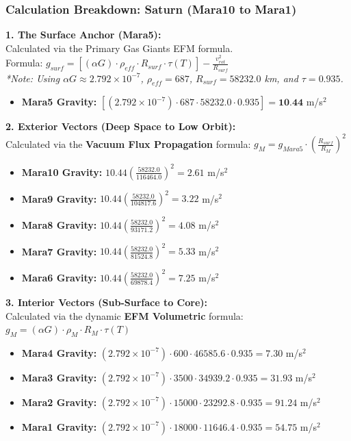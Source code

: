 \documentclass[11pt, a4paper]{article}
\begin{document}
\clearpage
\subsubsection{Calculation Breakdown: Saturn (Mara10 to Mara1)}

\noindent \textbf{1. The Surface Anchor (Mara5):} \\
Calculated via the Primary Gas Giants EFM formula. \\
Formula: $g_{surf} = \left[ (\alpha G) \cdot \rho_{eff} \cdot R_{surf} \cdot \tau(T) \right] - \frac{v_{rot}^2}{R_{surf}}$ \\
\textit{*Note: Using $\alpha G \approx 2.792 \times 10^{-7}$, $\rho_{eff} = 687$, $R_{surf} = 58232.0$ km, and $\tau = 0.935$.}
\begin{itemize}
  \item \textbf{Mara5 Gravity:} $\left[ (2.792 \times 10^{-7}) \cdot 687 \cdot 58232.0 \cdot 0.935 \right] = \textbf{10.44}$ m/s$^2$
\end{itemize}

\vspace{0.5em}
\noindent \textbf{2. Exterior Vectors (Deep Space to Low Orbit):} \\
Calculated via the \textbf{Vacuum Flux Propagation} formula: $g_M = g_{Mara5} \cdot \left( \frac{R_{surf}}{R_M} \right)^2$
\begin{itemize}
  \item \textbf{Mara10 Gravity:} $10.44 \left( \frac{58232.0}{116464.0} \right)^2 = 2.61$ m/s$^2$
  \item \textbf{Mara9 Gravity:} $10.44 \left( \frac{58232.0}{104817.6} \right)^2 = 3.22$ m/s$^2$
  \item \textbf{Mara8 Gravity:} $10.44 \left( \frac{58232.0}{93171.2} \right)^2 = 4.08$ m/s$^2$
  \item \textbf{Mara7 Gravity:} $10.44 \left( \frac{58232.0}{81524.8} \right)^2 = 5.33$ m/s$^2$
  \item \textbf{Mara6 Gravity:} $10.44 \left( \frac{58232.0}{69878.4} \right)^2 = 7.25$ m/s$^2$
\end{itemize}

\vspace{0.5em}
\noindent \textbf{3. Interior Vectors (Sub-Surface to Core):} \\
Calculated via the dynamic \textbf{EFM Volumetric} formula: $g_M = (\alpha G) \cdot \rho_{M} \cdot R_M \cdot \tau(T)$
\begin{itemize}
  \item \textbf{Mara4 Gravity:} $(2.792 \times 10^{-7}) \cdot 600 \cdot 46585.6 \cdot 0.935 = 7.30$ m/s$^2$
  \item \textbf{Mara3 Gravity:} $(2.792 \times 10^{-7}) \cdot 3500 \cdot 34939.2 \cdot 0.935 = 31.93$ m/s$^2$
  \item \textbf{Mara2 Gravity:} $(2.792 \times 10^{-7}) \cdot 15000 \cdot 23292.8 \cdot 0.935 = 91.24$ m/s$^2$
  \item \textbf{Mara1 Gravity:} $(2.792 \times 10^{-7}) \cdot 18000 \cdot 11646.4 \cdot 0.935 = 54.75$ m/s$^2$
\end{itemize}
\end{document}
